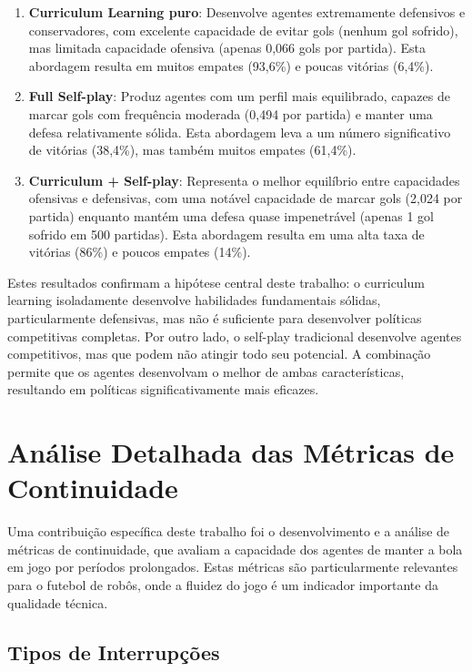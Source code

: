 \begin{enumerate}
    \item \textbf{Curriculum Learning puro}: Desenvolve agentes extremamente defensivos e conservadores, com excelente capacidade de evitar gols (nenhum gol sofrido), mas limitada capacidade ofensiva (apenas 0,066 gols por partida). Esta abordagem resulta em muitos empates (93,6\%) e poucas vitórias (6,4\%).
    
    \item \textbf{Full Self-play}: Produz agentes com um perfil mais equilibrado, capazes de marcar gols com frequência moderada (0,494 por partida) e manter uma defesa relativamente sólida. Esta abordagem leva a um número significativo de vitórias (38,4\%), mas também muitos empates (61,4\%).
    
    \item \textbf{Curriculum + Self-play}: Representa o melhor equilíbrio entre capacidades ofensivas e defensivas, com uma notável capacidade de marcar gols (2,024 por partida) enquanto mantém uma defesa quase impenetrável (apenas 1 gol sofrido em 500 partidas). Esta abordagem resulta em uma alta taxa de vitórias (86\%) e poucos empates (14\%).
\end{enumerate}

Estes resultados confirmam a hipótese central deste trabalho: o curriculum learning isoladamente desenvolve habilidades fundamentais sólidas, particularmente defensivas, mas não é suficiente para desenvolver políticas competitivas completas. Por outro lado, o self-play tradicional desenvolve agentes competitivos, mas que podem não atingir todo seu potencial. A combinação permite que os agentes desenvolvam o melhor de ambas características, resultando em políticas significativamente mais eficazes.

\section{Análise Detalhada das Métricas de Continuidade}
\label{sec:analise_continuidade}

Uma contribuição específica deste trabalho foi o desenvolvimento e a análise de métricas de continuidade, que avaliam a capacidade dos agentes de manter a bola em jogo por períodos prolongados. Estas métricas são particularmente relevantes para o futebol de robôs, onde a fluidez do jogo é um indicador importante da qualidade técnica.

\subsection{Tipos de Interrupções}

